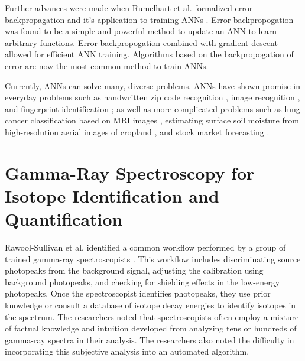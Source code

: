 
Further advances were made when Rumelhart et al. formalized error backpropagation and it's application to training ANNs \cite{Rumelhart1986}. Error backpropogation was found to be a simple and powerful method to update an ANN to learn arbitrary functions. Error backpropogation combined with gradient descent allowed for efficient ANN training. Algorithms based on the backpropogation of error are now the most common method to train ANNs. %

Currently, ANNs can solve many, diverse problems. ANNs have shown promise in everyday problems such as handwritten zip code recognition \cite{LeCun1989}, image recognition \cite{Krizhevsky2012}, and fingerprint identification \cite{Jeyanthia2015}; as well as more complicated problems such as lung cancer classification based on MRI images \cite{Selvakumari2016}, estimating surface soil moisture from high-resolution aerial images of cropland \cite{Hassan-Esfahani2015}, and stock market forecasting \cite{Rababaah2015}. 


\section{Gamma-Ray Spectroscopy for Isotope Identification and Quantification}

Rawool-Sullivan et al. identified a common workflow performed by a group of trained gamma-ray spectroscopists \cite{RawoolSullivan2010}. This workflow includes discriminating source photopeaks from the background signal, adjusting the calibration using background photopeaks, and checking for shielding effects in the low-energy photopeaks. Once the spectroscopist identifies photopeaks, they use prior knowledge or consult a database of isotope decay energies to identify isotopes in the spectrum. The researchers noted that spectroscopists often employ a mixture of factual knowledge and intuition developed from analyzing tens or hundreds of gamma-ray spectra in their analysis. The researchers also noted the difficulty in incorporating this subjective analysis into an automated algorithm.

